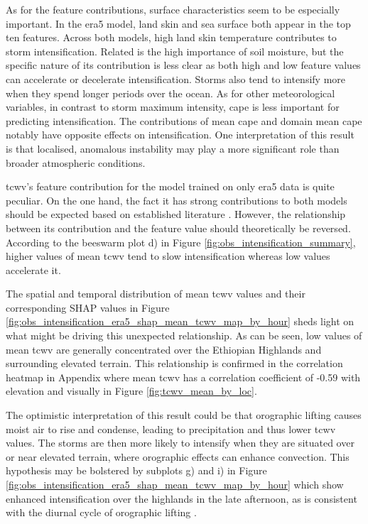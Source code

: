 As for the feature contributions, surface characteristics seem to be especially important. In the \acrshort{era5} model, land skin and sea surface both appear in the top ten features. Across both models, high land skin temperature contributes to storm intensification. Related is the high importance of soil moisture, but the specific nature of its contribution is less clear as both high and low feature values can accelerate or decelerate intensification. Storms also tend to intensify more when they spend longer periods over the ocean. As for other meteorological variables, in contrast to storm maximum intensity, \acrshort{cape} is less important for predicting intensification. The contributions of mean \acrshort{cape} and domain mean \acrshort{cape} notably have opposite effects on intensification. One interpretation of this result is that localised, anomalous instability may play a more significant role than broader atmospheric conditions.

\acrfull{tcwv}'s feature contribution for the model trained on only \acrshort{era5} data is quite peculiar. On the one hand, the fact it has strong contributions to both models should be expected based on established literature \citep{Li2023,Muetzelfeldt2025,Klein2020}. However, the relationship between its contribution and the feature value should theoretically be reversed. According to the beeswarm plot d) in Figure \ref{fig:obs_intensification_summary}, higher values of mean \acrshort{tcwv} tend to slow intensification whereas low values accelerate it.

The spatial and temporal distribution of mean \acrshort{tcwv} values and their corresponding SHAP values in Figure \ref{fig:obs_intensification_era5_shap_mean_tcwv_map_by_hour} sheds light on what might be driving this unexpected relationship. As can be seen, low values of mean \acrshort{tcwv} are generally concentrated over the Ethiopian Highlands and surrounding elevated terrain. This relationship is confirmed in the correlation heatmap in Appendix  where mean \acrshort{tcwv} has a correlation coefficient of -0.59 with elevation and visually in Figure \ref{fig:tcwv_mean_by_loc}.

The optimistic interpretation of this result could be that orographic lifting causes moist air to rise and condense, leading to precipitation and thus lower \acrshort{tcwv} values. The storms are then more likely to intensify when they are situated over or near elevated terrain, where orographic effects can enhance convection. This hypothesis may be bolstered by subplots g) and i) in Figure \ref{fig:obs_intensification_era5_shap_mean_tcwv_map_by_hour} which show enhanced intensification over the highlands in the late afternoon, as is consistent with the diurnal cycle of orographic lifting \citep{Colle2015,Negash2024,Zardi2013}.

